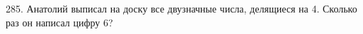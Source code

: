 285. Анатолий выписал на доску все двузначные числа, делящиеся на 4. Сколько раз он написал цифру 6?\\
